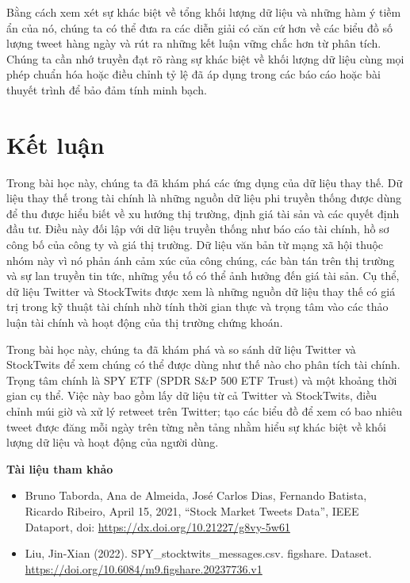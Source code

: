 Bằng cách xem xét sự khác biệt về tổng khối lượng dữ liệu và những hàm ý tiềm ẩn của nó, chúng ta có thể đưa ra các diễn giải có căn cứ hơn về các biểu đồ số lượng tweet hàng ngày và rút ra những kết luận vững chắc hơn từ phân tích. Chúng ta cần nhớ truyền đạt rõ ràng sự khác biệt về khối lượng dữ liệu cùng mọi phép chuẩn hóa hoặc điều chỉnh tỷ lệ đã áp dụng trong các báo cáo hoặc bài thuyết trình để bảo đảm tính minh bạch.

\section{Kết luận}

Trong bài học này, chúng ta đã khám phá các ứng dụng của dữ liệu thay thế. Dữ liệu thay thế trong tài chính là những nguồn dữ liệu phi truyền thống được dùng để thu được hiểu biết về xu hướng thị trường, định giá tài sản và các quyết định đầu tư. Điều này đối lập với dữ liệu truyền thống như báo cáo tài chính, hồ sơ công bố của công ty và giá thị trường. Dữ liệu văn bản từ mạng xã hội thuộc nhóm này vì nó phản ánh cảm xúc của công chúng, các bàn tán trên thị trường và sự lan truyền tin tức, những yếu tố có thể ảnh hưởng đến giá tài sản. Cụ thể, dữ liệu Twitter và StockTwits được xem là những nguồn dữ liệu thay thế có giá trị trong kỹ thuật tài chính nhờ tính thời gian thực và trọng tâm vào các thảo luận tài chính và hoạt động của thị trường chứng khoán.

Trong bài học này, chúng ta đã khám phá và so sánh dữ liệu Twitter và StockTwits để xem chúng có thể được dùng như thế nào cho phân tích tài chính. Trọng tâm chính là SPY ETF (SPDR S\&P 500 ETF Trust) và một khoảng thời gian cụ thể. Việc này bao gồm lấy dữ liệu từ cả Twitter và StockTwits, điều chỉnh múi giờ và xử lý retweet trên Twitter; tạo các biểu đồ để xem có bao nhiêu tweet được đăng mỗi ngày trên từng nền tảng nhằm hiểu sự khác biệt về khối lượng dữ liệu và hoạt động của người dùng.

\textbf{Tài liệu tham khảo}

\begin{itemize}
  \item Bruno Taborda, Ana de Almeida, José Carlos Dias, Fernando Batista, Ricardo Ribeiro, April 15, 2021, ``Stock Market Tweets Data'', IEEE Dataport, doi: \url{https://dx.doi.org/10.21227/g8vy-5w61}
  \item Liu, Jin-Xian (2022). SPY\_stocktwits\_messages.csv. figshare. Dataset. \url{https://doi.org/10.6084/m9.figshare.20237736.v1}
\end{itemize}
